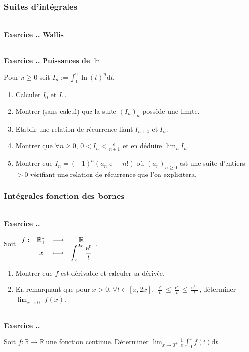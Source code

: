 \documentclass{article}
\newcommand{\fonction}[5]{\raisebox{-0.5\baselineskip}{$\begin{array}{lccc}
    #1: & #2 & \longrightarrow & #3 \\
        & #4 & \longmapsto & #5 \end{array}$}}
\newcommand{\di}{\mathrm{d}}
\newcommand{\ex}{{\operatorname{e}}}
\newcommand{\mb}[1]{\mathbb{#1}}
\newcounter{exo}
\newcommand{\exercice}[1][\null]{\textbf{\\ Exercice \thesection.\theexo. #1} \addtocounter{exo}{1}}
\begin{document}
\subsubsection{Suites d'intégrales}


\exercice[Wallis]

\exercice[Puissances de $\ln$]

Pour $n \ge 0$ soit $\displaystyle I_n := \int_{1}^{\ex} \ln(t)^n {\di} t$.

\begin{enumerate}

\item Calculer $I_0$ et $I_1$.

\item Montrer (sans calcul) que la suite $(I_n)_n$ possède une limite.

\item Etablir une relation de récurrence liant $I_{n+1}$ et $I_n$.

\item Montrer que $\forall n \ge 0$, $0<I_n<\frac{e}{n+1}$ et en déduire $\lim_n I_n$.

\item Montrer que $I_n = (-1)^n(a_n \ex - n!)$ où $(a_n)_{n \ge 0}$ est une suite d'entiers $>0$ vérifiant une relation de récurrence que l'on explicitera.

\end{enumerate}


\subsubsection{Intégrales fonction des bornes}


\exercice

Soit $ \fonction{f}{\mb{R^*_+}}{\mb{R}}{x}{\displaystyle \int_x^{2x} \frac{\ex^t}{t}}$.

\begin{enumerate}

\item Montrer que $f$ est dérivable et calculer sa dérivée.

\item En remarquant que pour $x>0$, $\forall t \in [x,2x]$, $\displaystyle \frac{\ex^x}{t} \le \frac{\ex^t}{t} \le \frac{\ex^{2x}}{t} $, déterminer $\displaystyle \lim_{x \rightarrow 0^+} f(x)$.

\end{enumerate}

\exercice

Soit $f : \mb{R} \rightarrow \mb{R}$ une fonction continue. Déterminer $\displaystyle \lim_{x \rightarrow 0^+} \frac{1}{x} \int_0^x f(t) \di t$.
\end{document}
